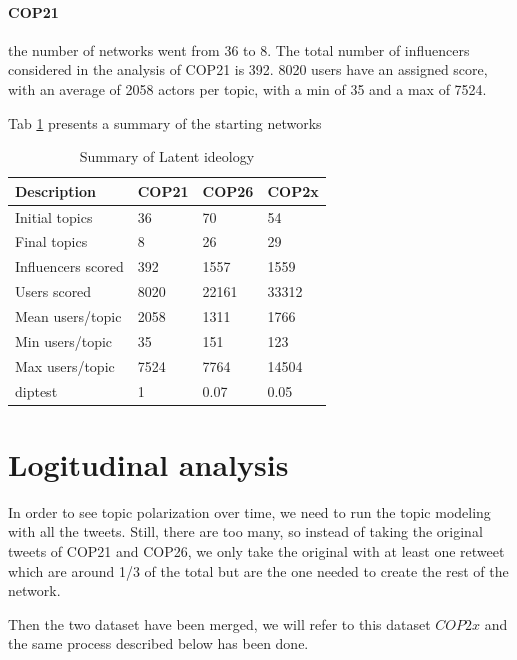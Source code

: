 \paragraph{COP21}
the number of networks went from 36 to 8. The total number of influencers considered in the analysis of COP21 is 392. 8020 users have an assigned score, with an average of 2058 actors per topic, with a min of 35 and a max of 7524. 

Tab  \ref{tab:recap_ideology} presents a summary of the starting networks 


\begin{table}[h]
    \centering
    \begin{tabular}{|l|l|l|l|}
        \hline
        \textbf{Description} & \textbf{COP21} & \textbf{COP26} & \textbf{COP2x}\\ \hline
        Initial topics & 36 & 70 & 54 \\ \hline
        Final topics & 8 & 26 & 29\\ \hline
        Influencers scored & 392 & 1557 & 1559\\ \hline
        Users scored & 8020 & 22161& 33312 \\ \hline
        Mean users/topic &  2058 & 1311 & 1766\\ \hline
        Min users/topic & 35 & 151 & 123\\ \hline
        Max users/topic & 7524 & 7764 & 14504\\ \hline
        diptest &1 & 0.07 & 0.05 \\ \hline
        \end{tabular}
        \caption{Summary of Latent ideology}
    \label{tab:recap_ideology}
\end{table}


\section{Logitudinal analysis}
In order to see topic polarization over time, we need to run the topic modeling with all the tweets. Still, there are too many, so instead of taking the original tweets of COP21 and COP26, we only take the original with at least one retweet which are around 1/3 of the total but are the one needed to create  the rest of the network.

Then the two dataset have been merged, we will refer to this dataset $COP2x$ and the same process described below has been done.




 
